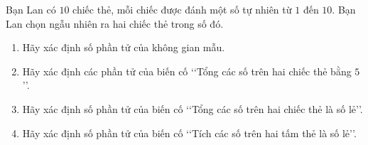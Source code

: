 \begin{bt}%
	Bạn Lan có $10$ chiếc thẻ, mỗi chiếc được đánh một số tự nhiên từ $1$ đến $10$. Bạn Lan chọn ngẫu nhiên ra hai chiếc thẻ trong  số đó.
	\begin{enumerate}
		\item Hãy  xác định số phần tử của không gian mẫu.
		\item Hãy xác định  các phần tử của biến cố \lq\lq Tổng các số trên hai chiếc thẻ bằng $5$\rq\rq.
		\item Hãy xác định số phần tử của biến cố \lq\lq Tổng các  số trên hai chiếc thẻ là số lẻ\rq\rq.
		\item Hãy xác định số  phần tử của biến cố \lq\lq Tích các số trên hai tấm thẻ là số lẻ\rq\rq.
	\end{enumerate}
\end{bt}

